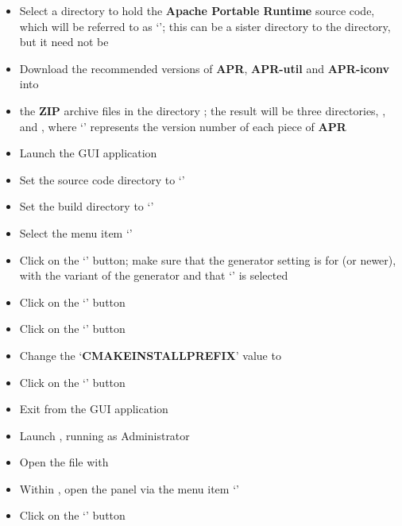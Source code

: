 \begin{itemize}
\item Select a directory to hold the \textbf{Apache Portable Runtime} source code, which
will be referred to as `'; this can be a sister directory to the
 directory, but it need not be
\item\exSp{}Download the recommended versions of \textbf{APR}, \textbf{APR-util} and
\textbf{APR-iconv} into 
\item\exSp{} the \textbf{ZIP} archive files in the directory
; the result will be three directories, ,\\
 and , where `'
represents the version number of each piece of \textbf{APR}
\item Launch the  GUI application
\item\exSp{}Set the source code directory to `'
\item\exSp{}Set the build directory to `'
\item\exSp{}Select the menu item `'
\item\exSp{}Click on the `' button; make sure that the generator
setting is for  (or newer), with the  variant of
the generator and that `' is selected
\item\exSp{}Click on the `' button
\item\exSp{}Click on the `' button
\item\exSp{}Change the `\textbf{CMAKE\fUS{}INSTALL\fUS{}PREFIX}' value to
\item\exSp{}Click on the `' button
\item\exSp{}Exit from the  GUI application
\item\exSp{}Launch , running as Administrator
\item\exSp{}Open the file
 with 
\item\exSp{}Within , open the  panel via the
menu item `'
\item\exSp{}Click on the `' button

\end{itemize}
